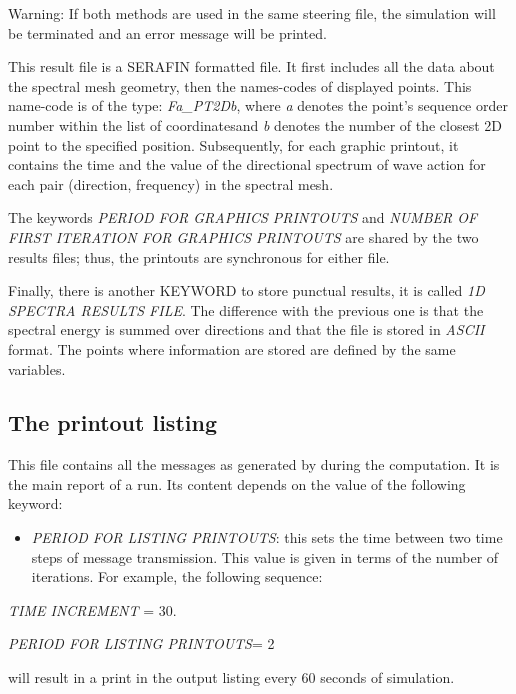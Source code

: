 \begin{WarningBlock}{Warning:}
If both methods are used in the same steering file, the simulation will be terminated and an error
message will be printed.
\end{WarningBlock}

This result file is a SERAFIN formatted file. It first includes all the data about the spectral mesh geometry,
then the names-codes of displayed points. This name-code is of the type: \textit{Fa\_PT2Db}, where \textit{a} 
denotes the point's sequence order number within the list of coordinatesand \textit{b} denotes the number of
the closest 2D point to the specified position. Subsequently, for each graphic printout, it contains the time
and the value of the directional spectrum of wave action for each pair (direction, frequency) in the spectral mesh.

The keywords \textit{PERIOD FOR GRAPHICS PRINTOUTS }and \textit{NUMBER OF FIRST ITERATION FOR GRAPHICS PRINTOUTS}
are shared by the two results files; thus, the printouts are synchronous for either file.

Finally, there is another KEYWORD to store punctual results, it is called \textit{1D SPECTRA RESULTS FILE}. The
difference with the previous one is that the spectral energy is summed over directions and that the file is
stored in \textit{ASCII} format. The points where information are stored are defined by the same variables.


\subsection{ The printout listing}

 This file contains all the messages as generated by \tomawac during the computation. It is the main report of a \tomawac run. Its content depends on the value of the following keyword:

\begin{itemize}
\item  \textit{PERIOD FOR LISTING PRINTOUTS}: this sets the time between two time steps of message transmission. This value is given in terms of the number of iterations. For example, the following sequence:
\end{itemize}

\textit{TIME INCREMENT} = 30.    

\textit{PERIOD FOR LISTING PRINTOUTS}= 2 

will result in a print in the output listing every 60 seconds of simulation.


